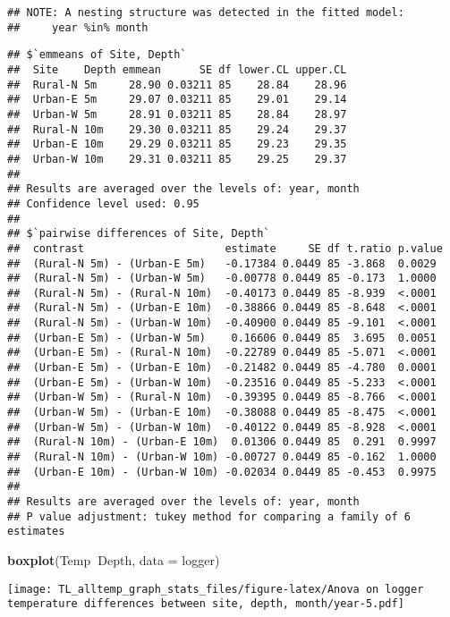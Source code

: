 \documentclass[
]{article}
\newenvironment{Shaded}{\begin{snugshade}}{\end{snugshade}}
\newcommand{\DataTypeTok}[1]{\textcolor[rgb]{0.13,0.29,0.53}{#1}}
\newcommand{\KeywordTok}[1]{\textcolor[rgb]{0.13,0.29,0.53}{\textbf{#1}}}
\newcommand{\NormalTok}[1]{#1}
\newcommand{\OperatorTok}[1]{\textcolor[rgb]{0.81,0.36,0.00}{\textbf{#1}}}
\begin{document}
\begin{verbatim}
## NOTE: A nesting structure was detected in the fitted model:
##     year %in% month
\end{verbatim}

\begin{verbatim}
## $`emmeans of Site, Depth`
##  Site    Depth emmean      SE df lower.CL upper.CL
##  Rural-N 5m     28.90 0.03211 85    28.84    28.96
##  Urban-E 5m     29.07 0.03211 85    29.01    29.14
##  Urban-W 5m     28.91 0.03211 85    28.84    28.97
##  Rural-N 10m    29.30 0.03211 85    29.24    29.37
##  Urban-E 10m    29.29 0.03211 85    29.23    29.35
##  Urban-W 10m    29.31 0.03211 85    29.25    29.37
## 
## Results are averaged over the levels of: year, month 
## Confidence level used: 0.95 
## 
## $`pairwise differences of Site, Depth`
##  contrast                      estimate     SE df t.ratio p.value
##  (Rural-N 5m) - (Urban-E 5m)   -0.17384 0.0449 85 -3.868  0.0029 
##  (Rural-N 5m) - (Urban-W 5m)   -0.00778 0.0449 85 -0.173  1.0000 
##  (Rural-N 5m) - (Rural-N 10m)  -0.40173 0.0449 85 -8.939  <.0001 
##  (Rural-N 5m) - (Urban-E 10m)  -0.38866 0.0449 85 -8.648  <.0001 
##  (Rural-N 5m) - (Urban-W 10m)  -0.40900 0.0449 85 -9.101  <.0001 
##  (Urban-E 5m) - (Urban-W 5m)    0.16606 0.0449 85  3.695  0.0051 
##  (Urban-E 5m) - (Rural-N 10m)  -0.22789 0.0449 85 -5.071  <.0001 
##  (Urban-E 5m) - (Urban-E 10m)  -0.21482 0.0449 85 -4.780  0.0001 
##  (Urban-E 5m) - (Urban-W 10m)  -0.23516 0.0449 85 -5.233  <.0001 
##  (Urban-W 5m) - (Rural-N 10m)  -0.39395 0.0449 85 -8.766  <.0001 
##  (Urban-W 5m) - (Urban-E 10m)  -0.38088 0.0449 85 -8.475  <.0001 
##  (Urban-W 5m) - (Urban-W 10m)  -0.40122 0.0449 85 -8.928  <.0001 
##  (Rural-N 10m) - (Urban-E 10m)  0.01306 0.0449 85  0.291  0.9997 
##  (Rural-N 10m) - (Urban-W 10m) -0.00727 0.0449 85 -0.162  1.0000 
##  (Urban-E 10m) - (Urban-W 10m) -0.02034 0.0449 85 -0.453  0.9975 
## 
## Results are averaged over the levels of: year, month 
## P value adjustment: tukey method for comparing a family of 6 estimates
\end{verbatim}

\begin{Shaded}
\begin{Highlighting}[]
\KeywordTok{boxplot}\NormalTok{(Temp}\OperatorTok{~}\NormalTok{Depth, }\DataTypeTok{data =}\NormalTok{ logger)}
\end{Highlighting}
\end{Shaded}

\texttt{[image: TL\_alltemp\_graph\_stats\_files/figure-latex/Anova on logger temperature differences between site, depth, month/year-5.pdf]}
\end{document}

